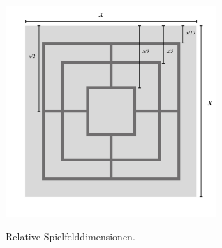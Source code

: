 \documentclass[paper=A4, deutsch]{scrartcl}
\begin{document}
\begin{figure}[ht]
	\centering
		\includegraphics[width=8cm]{Spielbrett_relativeDimensionen_grafik.jpg}\\
	\caption[Relative Spielfelddimensionen]{Relative Spielfelddimensionen.}
	\label{fig:nettop}
\end{figure}
\end{document}

